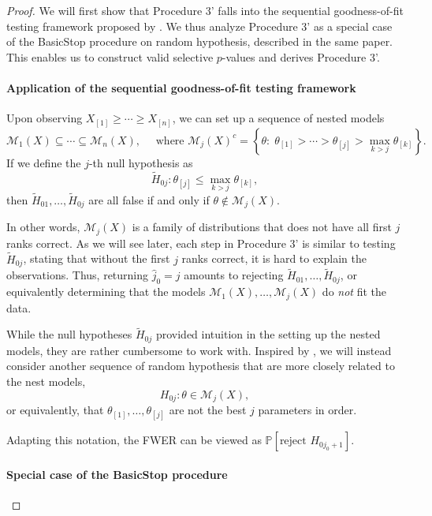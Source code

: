 \documentclass[11pt]{article}
\theoremstyle{definition}
\theoremstyle{custom}
\newcommand{\PP}{\mathbb{P}}
\begin{document}
\begin{proof}
We will first show that Procedure 3' falls into the sequential goodness-of-fit testing framework proposed by \citet{Fithian:2015uj}. We thus analyze Procedure 3' as a special case of the BasicStop procedure on random hypothesis, described in the same paper. This enables us to construct valid selective $p$-values and derives Procedure 3'.

\paragraph{Application of the sequential goodness-of-fit testing framework}

Upon observing $X_{[1]} \ge \cdots \ge X_{[n]}$, we can set up a sequence of nested models
$$\mathcal{M}_1\left(X\right) \subseteq \cdots \subseteq \mathcal{M}_n\left(X\right), \quad\text{ where } \mathcal{M}_j\left(X\right)^c = \left\{\theta:\; \theta_{[1]} > \cdots > \theta_{[j]} > \max_{k > j} \theta_{[k]}\right\}.$$
If we define the $j$-th null hypothesis as
$$\widetilde{H}_{0j}: \theta_{[j]} \le \max_{k > j} \theta_{[k]},$$
then $\widetilde{H}_{01},\ldots,\widetilde{H}_{0j}$ are all false if and only if $\theta\notin \mathcal{M}_j(X)$.

In other words, $\mathcal{M}_j\left(X\right)$ is a family of distributions that does not have all first $j$ ranks correct. As we will see later, each step in Procedure 3' is similar to testing $\widetilde{H}_{0j}$, stating that without the first $j$ ranks correct, it is hard to explain the observations. Thus, returning $\hat{j}_0 = j$ amounts to rejecting $\widetilde{H}_{01},\ldots,\widetilde{H}_{0j}$, or equivalently determining that the models $\mathcal{M}_1(X), \ldots, \mathcal{M}_j(X)$ do {\em not} fit the data.

While the null hypotheses $\widetilde{H}_{0j}$ provided intuition in the setting up the nested models, they are rather cumbersome to work with. Inspired by \citet{Fithian:2015uj}, we will instead consider another sequence of random hypothesis that are more closely related to the nest models,
$$H_{0j}: \theta \in \mathcal{M}_j\left(X\right),$$
or equivalently, that $\theta_{[1]}, \ldots, \theta_{[j]}$ are not the best $j$ parameters in order.

Adapting this notation, the FWER can be viewed as $\PP\left[\text{reject } H_{0 {j_0+1}}\right]$.

\paragraph{Special case of the BasicStop procedure}


\end{proof}
\end{document}
